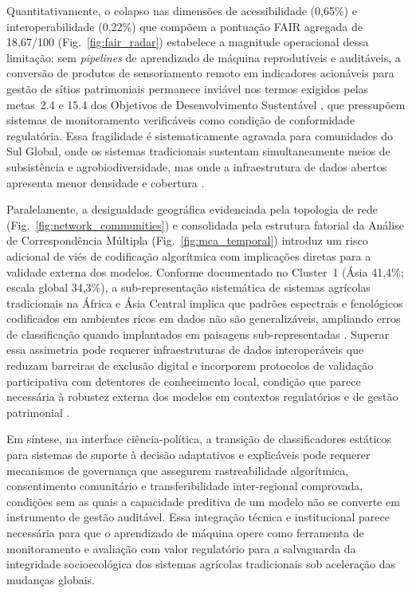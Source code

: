 \documentclass[lineno,pdflatex,sn-apa]{sn-jnl}%
\begin{document}
Quantitativamente, o colapso nas dimensões de acessibilidade (0,65\%) e interoperabilidade (0,22\%) que compõem a pontuação FAIR agregada de 18,67/100 (Fig.~\ref{fig:fair_radar}) estabelece a magnitude operacional dessa limitação: sem \textit{pipelines} de aprendizado de máquina reprodutíveis e auditáveis, a conversão de produtos de sensoriamento remoto em indicadores acionáveis para gestão de sítios patrimoniais permanece inviável nos termos exigidos pelas metas~2.4 e 15.4 dos Objetivos de Desenvolvimento Sustentável \citep{UN2015,Mottet2020TAPE}, que pressupõem sistemas de monitoramento verificáveis como condição de conformidade regulatória. Essa fragilidade é sistematicamente agravada para comunidades do Sul Global, onde os sistemas tradicionais sustentam simultaneamente meios de subsistência e agrobiodiversidade, mas onde a infraestrutura de dados abertos apresenta menor densidade e cobertura \citep{Kshetri2014DigitalDivide}.

Paralelamente, a desigualdade geográfica evidenciada pela topologia de rede (Fig.~\ref{fig:network_communities}) e consolidada pela estrutura fatorial da Análise de Correspondência Múltipla (Fig.~\ref{fig:mca_temporal}) introduz um risco adicional de viés de codificação algorítmica com implicações diretas para a validade externa dos modelos. Conforme documentado no Cluster~1 (Ásia 41,4\%; escala global 34,3\%), a sub-representação sistemática de sistemas agrícolas tradicionais na África e Ásia Central implica que padrões espectrais e fenológicos codificados em ambientes ricos em dados não são generalizáveis, ampliando erros de classificação quando implantados em paisagens sub-representadas \citep{Santos2007Epistemologies,Tuia2021}. Superar essa assimetria pode requerer infraestruturas de dados interoperáveis que reduzam barreiras de exclusão digital \citep{Kshetri2014DigitalDivide} e incorporem protocolos de validação participativa com detentores de conhecimento local, condição que parece necessária à robustez externa dos modelos em contextos regulatórios e de gestão patrimonial \citep{Berkes2003,Altieri2004}.

Em síntese, na interface ciência-política, a transição de classificadores estáticos para sistemas de suporte à decisão adaptativos e explicáveis pode requerer mecanismos de governança que assegurem rastreabilidade algorítmica, consentimento comunitário e transferibilidade inter-regional comprovada, condições sem as quais a capacidade preditiva de um modelo não se converte em instrumento de gestão auditável. Essa integração técnica e institucional parece necessária para que o aprendizado de máquina opere como ferramenta de monitoramento e avaliação com valor regulatório para a salvaguarda da integridade socioecológica dos sistemas agrícolas tradicionais sob aceleração das mudanças globais.
\end{document}
